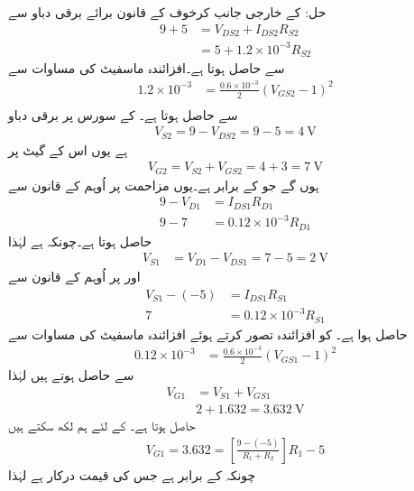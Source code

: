 حل: کے خارجی جانب کرخوف کے قانون برائے برقی دباو سے
\begin{align*}
9+5 &=V_{DS2}+I_{DS2}R_{S2}\\
&=5+1.2 \times 10^{-3} R_{S2}
\end{align*}
سے  حاصل ہوتا ہے۔افزائندہ ماسفیٹ کی مساوات سے 
\begin{align*}
1.2 \times 10^{-3}&=\frac{0.6 \times 10^{-3}}{2} \left (V_{GS2}-1 \right)^2\\
\end{align*}
سے  حاصل ہوتا ہے۔ کے سورس پر برقی دباو
\begin{align*}
V_{S2}=9-V_{DS2}=9-5=\SI{4}{\volt}
\end{align*}
ہے یوں اس کے گیٹ پر 
\begin{align*}
V_{G2}=V_{S2}+V_{GS2}=4+3=\SI{7}{\volt}
\end{align*}
ہوں گے جو  کے برابر ہے۔یوں مزاحمت  پر اُوہم کے قانون سے
\begin{align*}
9-V_{D1}&=I_{DS1} R_{D1}\\
9-7&=0.12 \times 10^{-3} R_{D1}
\end{align*}
 حاصل ہوتا ہے۔چونکہ  ہے لہٰذا
\begin{align*}
V_{S1}&=V_{D1}-V_{DS1}=7-5=\SI{2}{\volt}
\end{align*}
اور  پر اُوہم کے قانون سے
\begin{align*}
V_{S1}-(-5)&=I_{DS1} R_{S1}\\
7&=0.12 \times 10^{-3} R_{S1}
\end{align*}
 حاصل ہوا ہے۔ کو افزائندہ تصور کرتے ہوئے افزائندہ ماسفیٹ کی مساوات سے
\begin{align*}
0.12 \times 10^{-3}&=\frac{0.6 \times 10^{-3}}{2} \left (V_{GS1}-1 \right)^2
\end{align*}
سے  حاصل ہوتے ہیں لہٰذا
\begin{align*}
V_{G1}&=V_{S1}+V_{GS1}\\
&2+1.632=\SI{3.632}{\volt}
\end{align*}
حاصل ہوتا ہے۔ کے لئے ہم لکھ سکتے ہیں
\begin{align*}
V_{G1}=3.632=\left[\frac{9-(-5)}{R_1+R_2}\right] R_1 -5
\end{align*}
چونکہ  کے برابر ہے جس کی قیمت  درکار ہے لہٰذا

